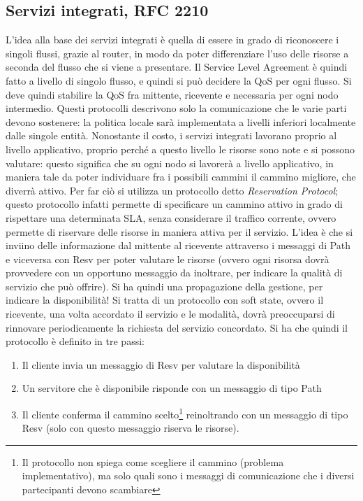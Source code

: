 \subsection{Servizi integrati, RFC 2210}
L'idea alla base dei servizi integrati è quella di essere in grado di riconoscere i singoli flussi, grazie al router,
in modo da poter differenziare l'uso delle risorse a seconda del flusso che si viene a presentare. Il Service Level
Agreement è quindi fatto a livello di singolo flusso, e quindi si può decidere la QoS per ogni flusso. Si deve quindi
stabilire la QoS fra mittente, ricevente e necessaria per ogni nodo intermedio. Questi protocolli descrivono solo la
comunicazione che le varie parti devono sostenere: la politica locale sarà implementata a livelli inferiori localmente dalle singole entità.
Nonostante il costo, i servizi integrati lavorano proprio al livello applicativo, proprio perché a questo
livello le risorse sono note e si possono valutare: questo significa che su ogni nodo si lavorerà a livello applicativo,
in maniera tale da poter individuare fra i possibili cammini il cammino migliore, che diverrà attivo. Per far ciò si
utilizza un protocollo detto \textit{Reservation Protocol}; questo protocollo infatti permette di specificare un
cammino attivo in grado di rispettare una determinata SLA, senza considerare il traffico corrente, ovvero permette di
riservare delle risorse in maniera attiva per il servizio. L'idea è che si inviino delle informazione dal mittente al ricevente attraverso i messaggi di Path e viceversa con Resv per poter valutare le risorse (ovvero ogni risorsa dovrà provvedere con un opportuno messaggio da inoltrare, per indicare la qualità di servizio che può offrire). Si ha quindi una propagazione della gestione, per indicare la disponibilità!
Si tratta di un protocollo con soft state, ovvero il ricevente, una volta accordato il servizio e le modalità, dovrà
preoccuparsi di rinnovare periodicamente la richiesta del servizio concordato. Si ha che quindi il protocollo è
definito in tre passi:
\begin{enumerate}
 \item Il cliente invia un messaggio di Resv per valutare la disponibilità
 \item Un servitore che è disponibile risponde con un messaggio di tipo Path
 \item Il cliente conferma il cammino scelto\footnote{Il protocollo non spiega come scegliere il cammino (problema
 implementativo), ma solo quali sono i messaggi di comunicazione che i diversi partecipanti devono scambiare}
 reinoltrando con un messaggio di tipo Resv (solo con questo messaggio riserva le risorse).
\end{enumerate}
